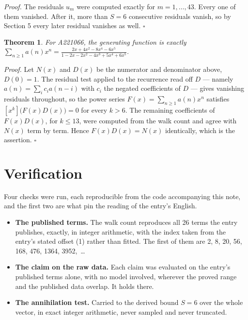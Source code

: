 \documentclass[11pt]{article}
\newtheorem{theorem}{Theorem}
\theoremstyle{definition}
\begin{document}
{\itshape Proof.} The residuals $u_m$ were computed exactly for $m = 1,\dots,43$. Every one of them vanished. After it, more than $S = 6$ consecutive residuals vanish, so by Section 5 every later residual vanishes as well. $\square$

\begin{theorem} For A221066, the generating function is exactly $\sum_{n\ge 1} a(n)x^n = \frac{2x + 4x^{2} - 8x^{4} - 6x^{5}}{1 - 2x - 2x^{2} - 4x^{3} + 5x^{4} + 6x^{5}}$.\end{theorem}

{\itshape Proof.} Let $N(x)$ and $D(x)$ be the numerator and denominator above, $D(0)=1$. The residual test applied to the recurrence read off $D$ --- namely $a(n) = \sum_i c_i a(n-i)$ with $c_i$ the negated coefficients of $D$ --- gives vanishing residuals throughout, so the power series $F(x)=\sum_{n\ge 1}a(n)x^n$ satisfies $[x^k]\bigl(F(x)D(x)\bigr) = 0$ for every $k > 6$. The remaining coefficients of $F(x)D(x)$, for $k \le 13$, were computed from the walk count and agree with $N(x)$ term by term. Hence $F(x)D(x) = N(x)$ identically, which is the assertion. $\square$

\section{Verification}

Four checks were run, each reproducible from the code accompanying this note, and the first two are what pin the reading of the entry's English.

\begin{itemize}

\item {\bfseries The published terms.} The walk count reproduces all 26 terms the entry publishes, exactly, in integer arithmetic, with the index taken from the entry's stated offset (1) rather than fitted. The first of them are 2, 8, 20, 56, 168, 476, 1364, 3952,~\dots

\item {\bfseries The claim on the raw data.} Each claim was evaluated on the entry's published terms alone, with no model involved, wherever the proved range and the published data overlap. It holds there.

\item {\bfseries The annihilation test.} Carried to the derived bound $S = 6$ over the whole vector, in exact integer arithmetic, never sampled and never truncated.

\end{itemize}
\end{document}
